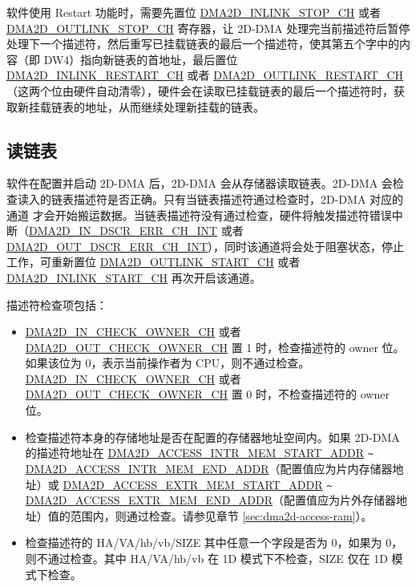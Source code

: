 \documentclass[main\_\_CN.tex]{subfiles}
\begin{document}
软件使用 Restart 功能时，需要先置位 \hyperref[fielddesc:DMA2DINLINKSTOPCHN]{DMA2D\_INLINK\_STOP\_CH} 或者 \hyperref[fielddesc:DMA2DOUTLINKSTOPCHN]{DMA2D\_OUTLINK\_STOP\_CH} 寄存器，让 2D-DMA 处理完当前描述符后暂停处理下一个描述符，然后重写已挂载链表的最后一个描述符，使其第五个字中的内容（即 DW4）指向新链表的首地址，最后置位 \hyperref[fielddesc:DMA2DINLINKRESTARTCHN]{DMA2D\_INLINK\_RESTART\_CH} 或者 \hyperref[fielddesc:DMA2DOUTLINKRESTARTCHN]{DMA2D\_OUTLINK\_RESTART\_CH}（这两个位由硬件自动清零），硬件会在读取已挂载链表的最后一个描述符时，获取新挂载链表的地址，从而继续处理新挂载的链表。



\subsection{读链表}

软件在配置并启动 2D-DMA 后，2D-DMA 会从存储器读取链表。2D-DMA 会检查读入的链表描述符是否正确。只有当链表描述符通过检查时，2D-DMA 对应的通道 才会开始搬运数据。当链表描述符没有通过检查，硬件将触发描述符错误中断（\hyperref[int:DMA2DINDSCRERRINT]{DMA2D\_IN\_DSCR\_ERR\_CH\_INT} 或者 \hyperref[int:DMA2DOUTDSCRERRINT]{DMA2D\_OUT\_DSCR\_ERR\_CH\_INT}），同时该通道将会处于阻塞状态，停止工作，可重新置位  \hyperref[fielddesc:DMA2DOUTLINKSTARTCHN]{DMA2D\_OUTLINK\_START\_CH} 或者  \hyperref[fielddesc:DMA2DINLINKSTARTCHN]{DMA2D\_INLINK\_START\_CH} 再次开启该通道。

描述符检查项包括：
\begin{itemize}
    \item \hyperref[fielddesc:DMA2DINCHECKOWNERCHN]{DMA2D\_IN\_CHECK\_OWNER\_CH} 或者 \hyperref[fielddesc:DMA2DOUTCHECKOWNERCHN]{DMA2D\_OUT\_CHECK\_OWNER\_CH} 置 1 时，检查描述符的 owner 位。如果该位为 0，表示当前操作者为 CPU，则不通过检查。\hyperref[fielddesc:DMA2DINCHECKOWNERCHN]{DMA2D\_IN\_CHECK\_OWNER\_CH} 或者 \hyperref[fielddesc:DMA2DOUTCHECKOWNERCHN]{DMA2D\_OUT\_CHECK\_OWNER\_CH} 置 0 时，不检查描述符的 owner 位。\\

    \item 检查描述符本身的存储地址是否在配置的存储器地址空间内。如果 2D-DMA 的描述符地址在 \hyperref[fielddesc:DMA2DACCESSINTRMEMSTARTADDR]{DMA2D\_ACCESS\_INTR\_MEM\_START\_ADDR} \verb+~+ \hyperref[fielddesc:DMA2DACCESSINTRMEMENDADDR]{DMA2D\_ACCESS\_INTR\_MEM\_END\_ADDR}（配置值应为片内存储器地址）或 \hyperref[fielddesc:DMA2DACCESSEXTRMEMSTARTADDR]{DMA2D\_ACCESS\_EXTR\_MEM\_START\_ADDR} \verb+~+ \hyperref[fielddesc:DMA2DACCESSEXTRMEMENDADDR]{DMA2D\_ACCESS\_EXTR\_MEM\_END\_ADDR}（配置值应为片外存储器地址）值的范围内，则通过检查。请参见章节 \ref{sec:dma2d-access-ram}）。\\

    \item 检查描述符的 HA/VA/hb/vb/SIZE 其中任意一个字段是否为 0，如果为 0，则不通过检查。其中 HA/VA/hb/vb 在 1D 模式下不检查，SIZE 仅在 1D 模式下检查。
\end{itemize}
\end{document}
